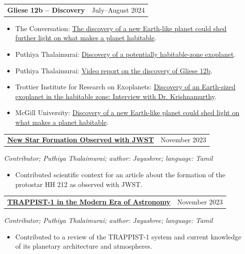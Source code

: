 \documentclass[10pt,a4paper]{article}
\makeatletter
\newcommand{\grantheading}[2]{%
\begin{tabularx}{\textwidth}{
    @{}
    >{\raggedright\arraybackslash}X
    >{\raggedleft\arraybackslash}p{4.5cm}
    @{}
}
\textbf{#1} & #2
\end{tabularx}
}
\newenvironment{lightitems}
{%
  \begin{itemize}[
      label=\textcolor{entrylight}{\textbullet},
      leftmargin=1.3em,
      itemsep=1pt,
      topsep=2pt,
      parsep=0pt
  ]
  \color{entrylight}
}
{%
  \end{itemize}
}
\makeatother
\begin{document}
\grantheading
{Gliese 12b -- Discovery}
{July--August 2024}
\begin{lightitems}
\item
\vspace{-1.5mm}The Conversation:
\href{https://theconversation.com/the-discovery-of-a-new-earth-like-planet-could-shed-further-light-on-what-makes-a-planet-habitable-234127}
{The discovery of a new Earth-like planet could shed further light on
what makes a planet habitable}.
\item
Puthiya Thalaimurai:
\href{https://www.puthiyathalaimurai.com/technology/a-planet-like-earth-has-surprised-scientists}
{Discovery of a potentially habitable-zone exoplanet}.
\item
Puthiya Thalaimurai:
\href{https://youtu.be/AXB-5W64Iac}
{Video report on the discovery of Gliese 12b}.
\item
Trottier Institute for Research on Exoplanets:
\href{https://exoplanetes.umontreal.ca/en/discovery-of-an-earth-like-exoplanet-in-the-habitable-zone-interview-with-vigneshwaran-krishnamurthy/}
{Discovery of an Earth-sized exoplanet in the habitable zone:
Interview with Dr. Krishnamurthy}.
\item
McGill University:
\href{https://www.mcgill.ca/newsroom/channels/news/expert-discovery-new-earth-planet-could-shed-light-what-makes-planet-habitable-358213}
{Discovery of a new Earth-like planet could shed light on what makes
a planet habitable}.
\end{lightitems}

\grantheading
{\href{https://www.puthiyathalaimurai.com/technology/james-webb-telescope-invented-a-new-emerging-solar-family}
{New Star Formation Observed with JWST}}
{November 2023}
\emph{Contributor; Puthiya Thalaimurai; author: Jayashree; language: Tamil}
\begin{lightitems}
\item
\vspace{-1.5mm}Contributed scientific context for an article about the formation of
the protostar HH 212 as observed with JWST.
\end{lightitems}

\grantheading
{\href{https://www.puthiyathalaimurai.com/technology/surprising-discovery-of-3-planets-like-earth-in-trappist1-family}
{TRAPPIST-1 in the Modern Era of Astronomy}}
{November 2023}
\emph{Contributor; Puthiya Thalaimurai; author: Jayashree; language: Tamil}
\begin{lightitems}
\item
\vspace{-1.5mm}Contributed to a review of the TRAPPIST-1 system and current knowledge
of its planetary architecture and atmospheres.
\end{lightitems}
\end{document}

